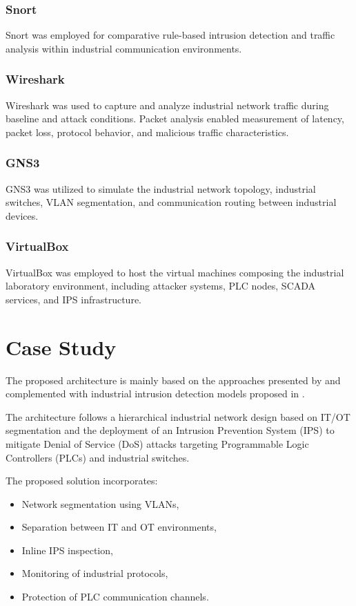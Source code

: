 \documentclass[sigconf]{acmart}
\begin{document}
\subsubsection{Snort}
Snort was employed for comparative rule-based intrusion detection and traffic analysis within industrial communication environments.

\subsubsection{Wireshark}
Wireshark was used to capture and analyze industrial network traffic during baseline and attack conditions. Packet analysis enabled measurement of latency, packet loss, protocol behavior, and malicious traffic characteristics.

\subsubsection{GNS3}
GNS3 was utilized to simulate the industrial network topology, industrial switches, VLAN segmentation, and communication routing between industrial devices.

\subsubsection{VirtualBox}
VirtualBox was employed to host the virtual machines composing the industrial laboratory environment, including attacker systems, PLC nodes, SCADA services, and IPS infrastructure.


\section{Case Study}
The proposed architecture is mainly based on the approaches presented by \cite{fraunholz2018industrial} and complemented with industrial intrusion detection models proposed in \cite{sayegh2019ids}.

The architecture follows a hierarchical industrial network design based on IT/OT segmentation and the deployment of an Intrusion Prevention System (IPS) to mitigate Denial of Service (DoS) attacks targeting Programmable Logic Controllers (PLCs) and industrial switches.

The proposed solution incorporates:
\begin{itemize}
    \item Network segmentation using VLANs,
    \item Separation between IT and OT environments,
    \item Inline IPS inspection,
    \item Monitoring of industrial protocols,
    \item Protection of PLC communication channels.
\end{itemize}
\end{document}
